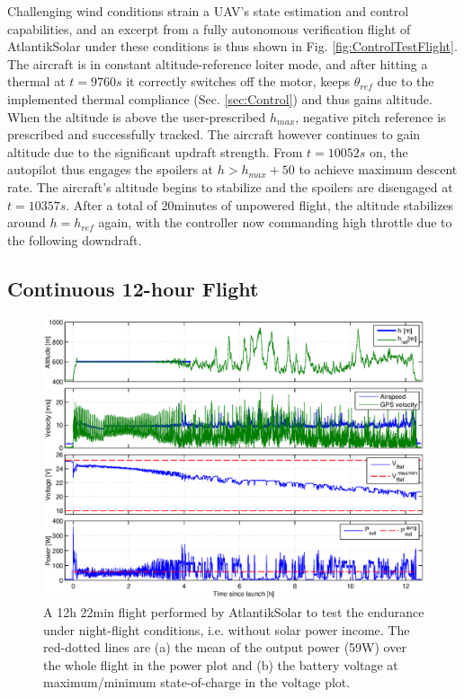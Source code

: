 Challenging wind conditions strain a UAV's state estimation and control capabilities, and an excerpt from a fully autonomous verification flight of AtlantikSolar under these conditions is thus shown in Fig. \ref{fig:ControlTestFlight}. The aircraft is in constant altitude-reference loiter mode, and after hitting a thermal at $t=9760s$ it correctly switches off the motor, keeps $\theta_{ref}$ due to the implemented thermal compliance (Sec. \ref{sec:Control}) and thus gains altitude. When the altitude is above the user-prescribed $h_{max}$, negative pitch reference is prescribed and successfully tracked. The aircraft however continues to gain altitude due to the significant updraft strength. From $t=10052s$ on, the autopilot thus engages the spoilers at $h>h_{max}+50$ to achieve maximum descent rate. The aircraft's altitude begins to stabilize and the spoilers are disengaged at $t=10357s$. After a total of 20minutes of unpowered flight, the altitude stabilizes around $h=h_{ref}$ again, with the controller now commanding high throttle due to the following downdraft. 

\subsection{Continuous 12-hour Flight} \label{sec:12hFlight}
  
\begin{figure}[tb]
    \centering
     \includegraphics[width=\linewidth]{images/12hFlight}
    \caption{A 12h 22min flight performed by AtlantikSolar to test the endurance under night-flight conditions, i.e. without solar power income. The red-dotted lines are (a) the mean of the output power (59W) over the whole flight in the power plot and (b) the battery voltage at maximum/minimum state-of-charge in the voltage plot.} 
    \label{fig:12hFlight}
\end{figure}

